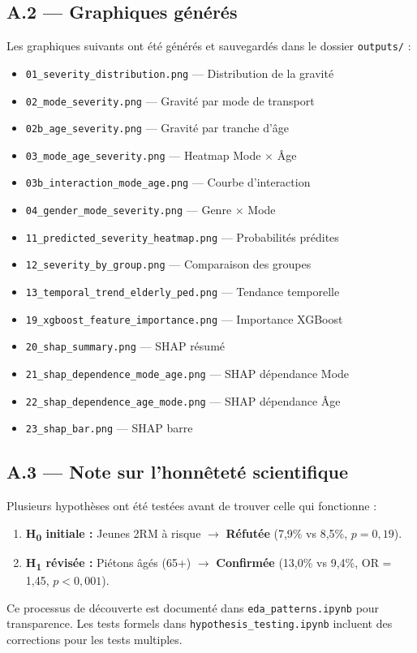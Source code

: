 \documentclass[12pt,a4paper]{article}
\begin{document}
\subsection{A.2 --- Graphiques générés}

Les graphiques suivants ont été générés et sauvegardés dans le dossier
\texttt{outputs/} :

\begin{itemize}
  \item \texttt{01\_severity\_distribution.png} --- Distribution de la gravité
  \item \texttt{02\_mode\_severity.png} --- Gravité par mode de transport
  \item \texttt{02b\_age\_severity.png} --- Gravité par tranche d'âge
  \item \texttt{03\_mode\_age\_severity.png} --- Heatmap Mode $\times$ \^Age
  \item \texttt{03b\_interaction\_mode\_age.png} --- Courbe d'interaction
  \item \texttt{04\_gender\_mode\_severity.png} --- Genre $\times$ Mode
  \item \texttt{11\_predicted\_severity\_heatmap.png} --- Probabilités prédites
  \item \texttt{12\_severity\_by\_group.png} --- Comparaison des groupes
  \item \texttt{13\_temporal\_trend\_elderly\_ped.png} --- Tendance temporelle
  \item \texttt{19\_xgboost\_feature\_importance.png} --- Importance XGBoost
  \item \texttt{20\_shap\_summary.png} --- SHAP résumé
  \item \texttt{21\_shap\_dependence\_mode\_age.png} --- SHAP dépendance Mode
  \item \texttt{22\_shap\_dependence\_age\_mode.png} --- SHAP dépendance \^Age
  \item \texttt{23\_shap\_bar.png} --- SHAP barre
\end{itemize}

\subsection{A.3 --- Note sur l'honnêteté scientifique}

Plusieurs hypothèses ont été testées avant de trouver celle qui fonctionne :
\begin{enumerate}[label=\textbf{\arabic*.}]
  \item \textbf{H\textsubscript{0} initiale :} Jeunes 2RM à risque
        $\rightarrow$ \textbf{Réfutée} (7,9\% vs 8,5\%, $p = 0,19$).
  \item \textbf{H\textsubscript{1} révisée :} Piétons âgés (65+)
        $\rightarrow$ \textbf{Confirmée} (13,0\% vs 9,4\%,
        OR = 1,45, $p < 0,001$).
\end{enumerate}

Ce processus de découverte est documenté dans
\texttt{eda\_patterns.ipynb} pour transparence. Les tests formels dans
\texttt{hypothesis\_testing.ipynb} incluent des corrections pour les
tests multiples.
\end{document}
